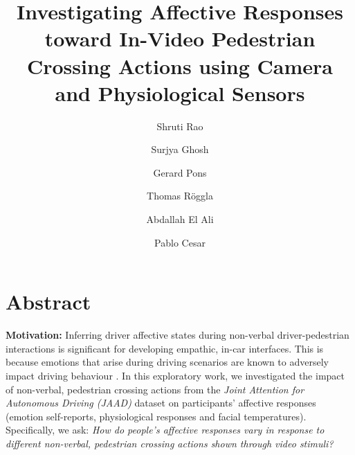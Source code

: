 \documentclass[acmlarge]{acmart}
\begin{document}
\title{Investigating Affective Responses toward In-Video Pedestrian Crossing Actions using Camera and Physiological Sensors}

\author{Shruti Rao}

\author{Surjya Ghosh}


\author{Gerard Pons}

\author{Thomas R\"{o}ggla}


\author{Abdallah El Ali}

\author{Pablo Cesar}


\renewcommand\shortauthors{Rao et al.}



\maketitle

\section*{Abstract}
\textbf{Motivation:} Inferring driver affective states during non-verbal driver-pedestrian interactions is significant for developing empathic, in-car interfaces. This is because emotions that arise during driving scenarios are known to adversely impact driving behaviour \cite{2015:tf:jeon}. In this exploratory work, we investigated the impact of non-verbal, pedestrian crossing actions from the \textit{Joint Attention for Autonomous Driving (JAAD)} \cite{2017:IV:rasouli, Ghosh2022} dataset on participants’  affective responses (emotion self-reports, physiological responses and facial temperatures). Specifically, we ask: \textit{How do people's affective responses vary in response to different non-verbal, pedestrian crossing actions shown through video stimuli?}
\\
\end{document}
